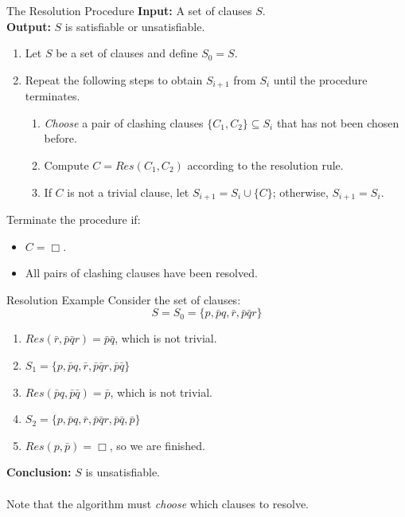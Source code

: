 \documentclass[style=sailor,size=12pt]{powerdot}
\theoremstyle{definition}
\newenvironment{ex}[1]
  {\renewcommand\theinnerexample{#1}\innerexample}
  {\endinnerexample}
\begin{document}
\begin{wideslide}[bm=,toc=]{The Resolution Procedure}
{ \bf Input:} A set of clauses $S$.\\
{ \bf Output:} $S$ is satisfiable or unsatisfiable.\\
\begin{enumerate}
\item Let $S$ be a set of clauses and define $S_0 = S$.
\item Repeat the following steps to obtain $S_{i+1}$ from $S_i$ until
the procedure terminates.
\begin{enumerate}
\item \emph{Choose} a pair of clashing clauses $\{C_1,C_2\} \subseteq S_i$ that
has not been chosen before.
\item Compute $C = Res(C_1,C_2)$ according to the resolution rule.
\item If $C$ is not a trivial clause, let $S_{i + 1} = S_i \cup \{C\}$;
otherwise, $S_{i+1} = S_i$.
\end{enumerate}
\end{enumerate}
Terminate the procedure if:
\begin{itemize}
\item $C = \Box$.
\item All pairs of clashing clauses have been resolved. 
\end{itemize}

\end{wideslide}

\begin{wideslide}[bm=,toc=]{Resolution Example}
\begin{ex}{4.19}
Consider the set of clauses:
\[
  S  = S_0 = \{p,\bar{p}q,\bar{r},\bar{p}\bar{q}r\}
  \]
\end{ex}
\begin{enumerate}
\item $Res(\bar{r},\bar{p}\bar{q}r) = \bar{p}\bar{q}$, which is not trivial.
\item $S_1  = \{p,\bar{p}q,\bar{r},\bar{p}\bar{q}r, \bar{p}\bar{q}\}$
\item $Res(\bar{p}q,\bar{p}\bar{q}) = \bar{p}$, which is not trivial.
\item $S_2  = \{p,\bar{p}q,\bar{r},\bar{p}\bar{q}r, \bar{p}\bar{q}, \bar{p}\}$
\item $Res(p,\bar{p}) = \Box $, so we are finished.
\end{enumerate}
{\bf Conclusion:} $S$ is unsatisfiable.\\
~\\
Note that the algorithm must \emph{choose} which clauses to resolve.
\end{wideslide}
\end{document}
